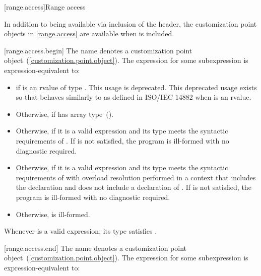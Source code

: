 [range.access]{Range access}

\pnum
In addition to being available via inclusion of the 
header, the customization point objects in \ref{range.access} are
available when  is included.

[range.access.begin]{}
\pnum
The name  denotes a customization point
 object~(\ref{customization.point.object}). The expression
 for some subexpression  is expression-equivalent to:

\begin{itemize}
\item
   if  is an rvalue of
  type . This usage is deprecated.
  \enternote This deprecated usage exists so that
   behaves similarly to 
  as defined in ISO/IEC 14882 when  is an rvalue. \exitnote

\item
  Otherwise,  if  has array
  type~().

\item
  Otherwise,  if it is a valid expression and its type  meets the
  syntactic requirements of . If
   is not satisfied, the program is ill-formed
  with no diagnostic required.

\item
  Otherwise,  if it is a valid expression and its type  meets the
  syntactic requirements of  with overload
  resolution performed in a context that includes the declaration
   and does not include
  a declaration of . If 
  is not satisfied, the program is ill-formed with no diagnostic
  required.

\item
  Otherwise,  is ill-formed.
\end{itemize}

\pnum
\enternote Whenever  is a valid expression, its
type satisfies . \exitnote

[range.access.end]{}
\pnum
The name  denotes a customization point
object~(\ref{customization.point.object}). The expression
 for some subexpression  is expression-equivalent to:

